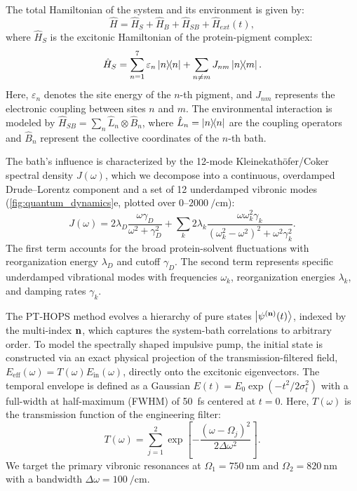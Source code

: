 \documentclass[journal=jpcl,manuscript=letter]{achemso}
\begin{document}
The total Hamiltonian of the system and its environment is given by:
\begin{equation}
\hat{H} = \hat{H}_S + \hat{H}_B + \hat{H}_{SB} + \hat{H}_{ext}(t),
\label{eq:total_hamiltonian}
\end{equation}
where $\hat{H}_S$ is the excitonic Hamiltonian of the protein-pigment complex:
\begin{equation}
\hat{H}_S = \sum_{n=1}^{7} \varepsilon_n \dyad{n} + \sum_{n \neq m} J_{nm} \dyad{n}{m}.
\label{eq:excitonic_hamiltonian}
\end{equation}
Here, $\varepsilon_n$ denotes the site energy of the $n$-th pigment, and $J_{nm}$ represents the electronic coupling between sites $n$ and $m$. The environmental interaction is modeled by $\hat{H}_{SB} = \sum_n \hat{L}_n \otimes \hat{B}_n$, where $\hat{L}_n = \dyad{n}$ are the coupling operators and $\hat{B}_n$ represent the collective coordinates of the $n$-th bath.

The bath's influence is characterized by the 12-mode Kleinekath\"ofer/Coker spectral density $J(\omega)$,\cite{Olbrich2011,Coker2011} which we decompose into a continuous, overdamped Drude--Lorentz component and a set of 12 underdamped vibronic modes (\cref{fig:quantum_dynamics}e, plotted over $0$--$\SI{2000}{\per\centi\meter}$):
\begin{equation}
J(\omega) = 2\lambda_D \frac{\omega \gamma_D}{\omega^2 + \gamma_D^2} + \sum_{k} 2\lambda_k \frac{\omega \omega_k^2 \gamma_k}{(\omega_k^2 - \omega^2)^2 + \omega^2 \gamma_k^2}.
\label{eq:spectral_density}
\end{equation}
The first term accounts for the broad protein-solvent fluctuations with reorganization energy $\lambda_D$ and cutoff $\gamma_D$. The second term represents specific underdamped vibrational modes with frequencies $\omega_k$, reorganization energies $\lambda_k$, and damping rates $\gamma_k$.

The PT-HOPS method evolves a hierarchy of pure states $\ket{\psi^{(\vb{n})}(t)}$, indexed by the multi-index $\vb{n}$, which captures the system-bath correlations to arbitrary order. To model the spectrally shaped impulsive pump, the initial state is constructed via an exact physical projection of the transmission-filtered field, $E_{\mathrm{eff}}(\omega) = T(\omega) E_{\mathrm{in}}(\omega)$, directly onto the excitonic eigenvectors. The temporal envelope is defined as a Gaussian $E(t) = E_0 \exp(-t^2/2\sigma_t^2)$ with a full-width at half-maximum (FWHM) of \SI{50}{\femto\second} centered at $t = 0$. Here, $T(\omega)$ is the transmission function of the engineering filter:
\begin{equation}
T(\omega) = \sum_{j=1}^2 \exp\left[ -\frac{(\omega - \Omega_{j})^2}{2\Delta\omega^2} \right].
\label{eq:transmission_function}
\end{equation}
We target the primary vibronic resonances at $\Omega_1 = \SI{750}{\nano\meter}$ and $\Omega_2 = \SI{820}{\nano\meter}$ with a bandwidth $\Delta\omega = \SI{100}{\per\centi\meter}$.
\end{document}

